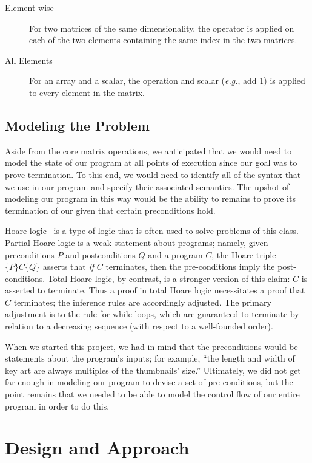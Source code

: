 \documentclass[11pt,conference]{IEEEtran}
\theoremstyle{plain} %
\theoremstyle{definition}
\theoremstyle{remark}
\begin{document}
\begin{description}
    \item[Element-wise] For two matrices of the same dimensionality, the
        operator is applied on each of the two elements containing the same
        index in the two matrices.
    \item[All Elements] For an array and a scalar, the operation and scalar
        (\textit{e.g.}, add 1) is applied to every element in the matrix.
\end{description}

\subsection{Modeling the Problem}

Aside from the core matrix operations, we anticipated that we would need to
model the state of our program at all points of execution since our goal was to
prove termination. To this end, we would need to identify all of the syntax that
we use in our program and specify their associated semantics. The upshot of
modeling our program in this way would be the ability to remains to prove its
termination of our given that certain preconditions hold.

Hoare logic~\cite{Hoare_1969} is a type of logic that is often used to solve
problems of this class. Partial Hoare logic is a weak statement about programs;
namely, given preconditions \(P\) and postconditions \(Q\) and a program \(C\),
the Hoare triple \(\{P\}C\{Q\}\) asserts that \emph{if} \(C\) terminates, then
the pre-conditions imply the post-conditions. Total Hoare logic, by contrast, is
a stronger version of this claim: \(C\) is asserted to terminate. Thus a proof
in total Hoare logic necessitates a proof that \(C\) terminates; the inference
rules are accordingly adjusted. The primary adjustment is to the rule for while
loops, which are guaranteed to terminate by relation to a decreasing sequence
(with respect to a well-founded order).

When we started this project, we had in mind that the preconditions would be
statements about the program's inputs; for example, ``the length and width of
key art are always multiples of the thumbnails' size.'' Ultimately, we did not
get far enough in modeling our program to devise a set of pre-conditions, but
the point remains that we needed to be able to model the control flow of our
entire program in order to do this.

\section{Design and Approach}\label{S:design}
\end{document}

